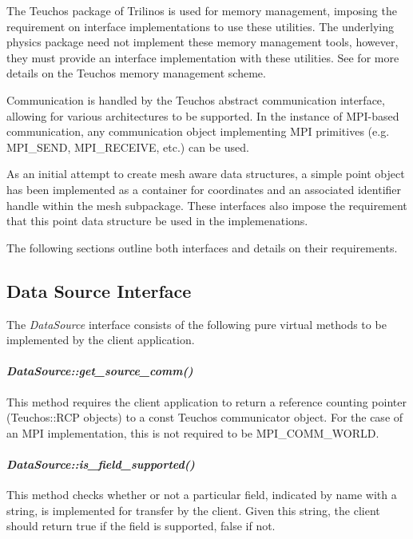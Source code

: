 \documentclass[letterpaper]{article}
\begin{document}
The Teuchos package of Trilinos is used for memory management,
imposing the requirement on interface implementations to use these
utilities. The underlying physics package need not implement these
memory management tools, however, they must provide an interface
implementation with these utilities. See \cite{Bartlett_2010} for more
details on the Teuchos memory management scheme.

Communication is handled by the Teuchos abstract communication
interface, allowing for various architectures to be supported. In the
instance of MPI-based communication, any communication object
implementing MPI primitives (e.g. MPI\_SEND, MPI\_RECEIVE, etc.) can
be used. 

As an initial attempt to create mesh aware data structures, a simple
point object has been implemented as a container for coordinates and
an associated identifier handle within the mesh subpackage. These
interfaces also impose the requirement that this point data structure
be used in the implemenations.

The following sections outline both interfaces and details on their
requirements. 

\subsection{Data Source Interface}
The {\sl DataSource} interface consists of the following pure
virtual methods to be implemented by the client application.

\paragraph{\sl DataSource::get\_source\_comm()}
This method requires the client application to return a reference
counting pointer (Teuchos::RCP objects) to a const Teuchos
communicator object. For the case of an MPI implementation, this is
not required to be MPI\_COMM\_WORLD.

\paragraph{\sl DataSource::is\_field\_supported()}
This method checks whether or not a particular field, indicated by
name with a string, is implemented for transfer by the client. Given
this string, the client should return true if the field is supported,
false if not.
\end{document}
